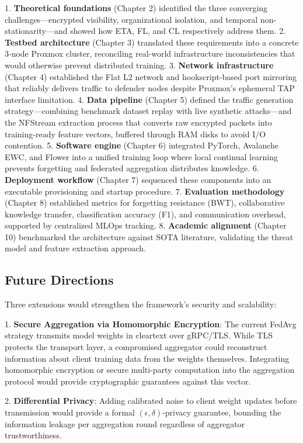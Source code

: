 \documentclass[conference]{IEEEtran}
\begin{document}
1. \textbf{Theoretical foundations} (Chapter 2) identified the three converging challenges—encrypted visibility, organizational isolation, and temporal non-stationarity—and showed how ETA, FL, and CL respectively address them.
2. \textbf{Testbed architecture} (Chapter 3) translated these requirements into a concrete 3-node Proxmox cluster, reconciling real-world infrastructure inconsistencies that would otherwise prevent distributed training.
3. \textbf{Network infrastructure} (Chapter 4) established the Flat L2 network and hookscript-based port mirroring that reliably delivers traffic to defender nodes despite Proxmox's ephemeral TAP interface limitation.
4. \textbf{Data pipeline} (Chapter 5) defined the traffic generation strategy—combining benchmark dataset replay with live synthetic attacks—and the NFStream extraction process that converts raw encrypted packets into training-ready feature vectors, buffered through RAM disks to avoid I/O contention.
5. \textbf{Software engine} (Chapter 6) integrated PyTorch, Avalanche EWC, and Flower into a unified training loop where local continual learning prevents forgetting and federated aggregation distributes knowledge.
6. \textbf{Deployment workflow} (Chapter 7) sequenced these components into an executable provisioning and startup procedure.
7. \textbf{Evaluation methodology} (Chapter 8) established metrics for forgetting resistance (BWT), collaborative knowledge transfer, classification accuracy (F1), and communication overhead, supported by centralized MLOps tracking.
8. \textbf{Academic alignment} (Chapter 10) benchmarked the architecture against SOTA literature, validating the threat model and feature extraction approach.


\subsection{Future Directions}

Three extensions would strengthen the framework's security and scalability:

1. \textbf{Secure Aggregation via Homomorphic Encryption}: The current FedAvg strategy transmits model weights in cleartext over gRPC/TLS. While TLS protects the transport layer, a compromised aggregator could reconstruct information about client training data from the weights themselves. Integrating homomorphic encryption or secure multi-party computation into the aggregation protocol would provide cryptographic guarantees against this vector.

2. \textbf{Differential Privacy}: Adding calibrated noise to client weight updates before transmission would provide a formal $(\epsilon, \delta)$-privacy guarantee, bounding the information leakage per aggregation round regardless of aggregator trustworthiness.
\end{document}
